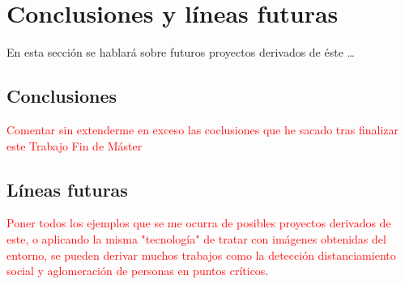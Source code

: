
\chapter{Conclusiones y líneas futuras}
\label{cha:concl-lineas-futuras}

En esta sección se hablará sobre futuros proyectos derivados de éste \ldots

\section{Conclusiones}
\label{sec:conclusiones-finales}

\textcolor{red}{Comentar sin extenderme en exceso las coclusiones que he sacado tras finalizar este Trabajo Fin de Máster}

\section{Líneas futuras}
\label{sec:lineas-futuras}

\textcolor{red}{Poner todos los ejemplos que se me ocurra de posibles proyectos derivados de este, o aplicando la misma "tecnología" de tratar con imágenes obtenidas del entorno, se pueden derivar muchos trabajos como la detección distanciamiento social y aglomeración de personas en puntos críticos}.